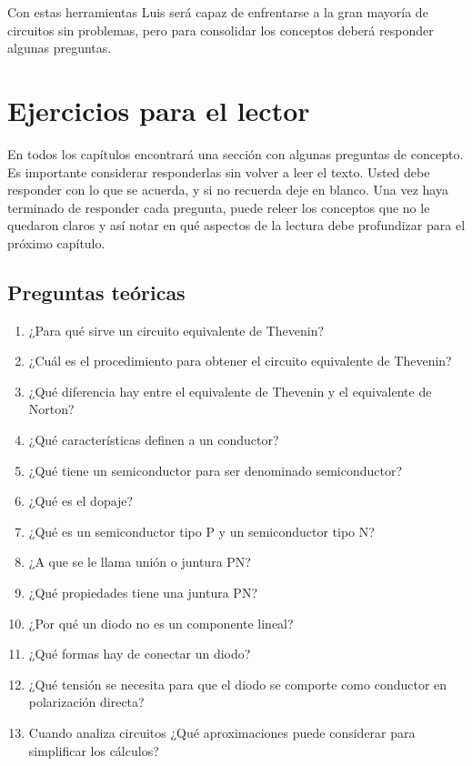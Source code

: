 Con estas herramientas Luis será capaz de enfrentarse a la gran mayoría de circuitos sin problemas, pero para consolidar los conceptos deberá responder algunas preguntas.

\section{Ejercicios para el lector}

En todos los capítulos encontrará una sección con algunas preguntas de concepto. Es importante considerar responderlas sin volver a leer el texto. Usted debe responder con lo que se acuerda, y si no recuerda deje en blanco. Una vez haya terminado de responder cada pregunta, puede releer los conceptos que no le quedaron claros y así notar en qué aspectos de la lectura debe profundizar para el próximo capítulo. 

\subsection{Preguntas teóricas}

\begin{enumerate}
  \item ¿Para qué sirve un circuito equivalente de Thevenin?
  \item ¿Cuál es el procedimiento para obtener el circuito equivalente de Thevenin?
  \item ¿Qué diferencia hay entre el equivalente de Thevenin y el equivalente de Norton?
  \item ¿Qué características definen a un conductor?
  \item ¿Qué tiene un semiconductor para ser denominado semiconductor?
  \item ¿Qué es el dopaje?
  \item ¿Qué es un semiconductor tipo P y un semiconductor tipo N?
  \item ¿A que se le llama unión o juntura PN?
  \item ¿Qué propiedades tiene una juntura PN?
  \item ¿Por qué un diodo no es un componente lineal?
  \item ¿Qué formas hay de conectar un diodo?
  \item ¿Qué tensión se necesita para que el diodo se comporte como conductor en polarización directa?
  \item Cuando analiza circuitos ¿Qué aproximaciones puede considerar para simplificar los cálculos?
\end{enumerate}
